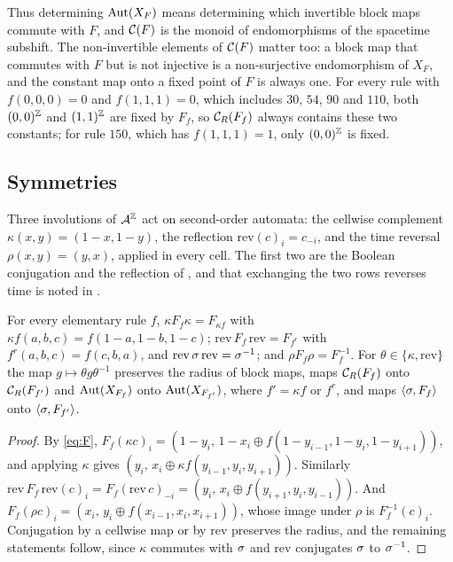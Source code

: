 Thus determining $\operatorname{Aut}(X_F)$ means determining which invertible block maps commute with $F$, and $\mathcal{C}(F)$ is the monoid of endomorphisms of the spacetime subshift. The non-invertible elements of $\mathcal{C}(F)$ matter too: a block map that commutes with $F$ but is not injective is a non-surjective endomorphism of $X_F$, and the constant map onto a fixed point of $F$ is always one. For every rule with $f(0,0,0)=0$ and $f(1,1,1)=0$, which includes $30$, $54$, $90$ and $110$, both $(0,0)^{\mathbb{Z}}$ and $(1,1)^{\mathbb{Z}}$ are fixed by $F_f$, so $\mathcal{C}_R(F_f)$ always contains these two constants; for rule $150$, which has $f(1,1,1)=1$, only $(0,0)^{\mathbb{Z}}$ is fixed.


\subsection{Symmetries}
Three involutions of $\mathcal{A}^{\mathbb{Z}}$ act on second-order automata: the cellwise complement $\kappa(x,y)=(1-x,1-y)$, the reflection $\mathrm{rev}(c)_i=c_{-i}$, and the time reversal $\rho(x,y)=(y,x)$, applied in every cell. The first two are the Boolean conjugation and the reflection of \cite[Section~2]{Takesue1989}, and that exchanging the two rows reverses time is noted in \cite[p.~2500]{Takesue1987}.

\begin{lemma}\label{lem:classes}
For every elementary rule $f$, $\kappa F_f\kappa=F_{\kappa f}$ with $\kappa f(a,b,c)=f(1-a,1-b,1-c)$; $\mathrm{rev}\,F_f\,\mathrm{rev}=F_{f^r}$ with $f^r(a,b,c)=f(c,b,a)$, and $\mathrm{rev}\,\sigma\,\mathrm{rev}=\sigma^{-1}$; and $\rho F_f\rho=F_f^{-1}$. For $\theta\in\{\kappa,\mathrm{rev}\}$ the map $g\mapsto\theta g\theta^{-1}$ preserves the radius of block maps, maps $\mathcal{C}_R(F_f)$ onto $\mathcal{C}_R(F_{f'})$ and $\operatorname{Aut}(X_{F_f})$ onto $\operatorname{Aut}(X_{F_{f'}})$, where $f'=\kappa f$ or $f^r$, and maps $\langle\sigma,F_f\rangle$ onto $\langle\sigma,F_{f'}\rangle$.
\end{lemma}

\begin{proof}
By \eqref{eq:F}, $F_f(\kappa c)_i=(1-y_i,\,1-x_i\oplus f(1-y_{i-1},1-y_i,1-y_{i+1}))$, and applying $\kappa$ gives $(y_i,\,x_i\oplus\kappa f(y_{i-1},y_i,y_{i+1}))$. Similarly $\mathrm{rev}\,F_f\,\mathrm{rev}(c)_i=F_f(\mathrm{rev}\,c)_{-i}=(y_i,\,x_i\oplus f(y_{i+1},y_i,y_{i-1}))$. And $F_f(\rho c)_i=(x_i,\,y_i\oplus f(x_{i-1},x_i,x_{i+1}))$, whose image under $\rho$ is $F_f^{-1}(c)_i$. Conjugation by a cellwise map or by $\mathrm{rev}$ preserves the radius, and the remaining statements follow, since $\kappa$ commutes with $\sigma$ and $\mathrm{rev}$ conjugates $\sigma$ to $\sigma^{-1}$.
\end{proof}

